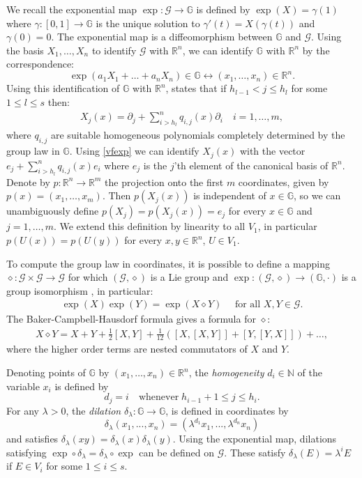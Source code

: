 \documentclass[reqno, 11pt]{amsart}
\theoremstyle{definition}
\theoremstyle{remark}
\numberwithin{theorem}{section}
\numberwithin{equation}{section}
\begin{document}
We recall the exponential map $\exp \colon \mathcal{G}\to \mathbb{G}$ is defined by $\exp(X)=\gamma(1)$ where
$\gamma \colon[0,1]\to \mathbb{G}$ is the unique solution to $\gamma'(t)=X(\gamma(t))$ and $\gamma(0)=0$. 
The exponential map is a diffeomorphism between $\mathbb{G}$ and $\mathcal{G}$. Using the basis $X_{1}, \ldots, X_{n}$ to identify $\mathcal{G}$ with $\mathbb{R}^n$, we can identify $\mathbb{G}$ with $\mathbb{R}^{n}$ by the correspondence:
\[ \exp(a_{1}X_{1}+\ldots +a_{n}X_{n})\in \mathbb{G} \longleftrightarrow (x_{1}, \ldots, x_{n})\in \mathbb{R}^{n}.\]
Using this identification of $\mathbb{G}$ with $\mathbb{R}^n$, \cite[Corollary 1.3.19]{BLU} states that if $h_{l-1}< j\leq h_l$ for some $1\leq l\leq s$ then:
\begin{align}\label{vfexp}
X_j(x)=\partial_j+\sum_{i>h_l}^n q_{i,j}(x)\partial_i \quad i=1,\ldots, m,
\end{align}
where $q_{i,j}$ are suitable homogeneous polynomials completely determined by the group law in $\mathbb{G}$. Using \eqref{vfexp} we can identify $X_j(x)$ with the vector
$e_j+\sum_{i>h_l}^n q_{i,j}(x)e_i$ where $e_j$ is the $j$'th element of the canonical basis of $\mathbb{R}^n$. Denote by $p\colon \mathbb{R}^{n} \to \mathbb{R}^{m}$ the projection onto the first $m$ coordinates, given by $p(x)=(x_{1}, \ldots, x_{m})$. Then $p(X_{j}(x))$ is independent of $x\in \mathbb{G}$, so we can unambiguously define $p(X_j)=p(X_j(x))=e_j$ for every $x\in\mathbb{G}$ and $j=1,\ldots, m$. We extend this definition by linearity to all $V_1$, in particular $p(U(x))=p(U(y))$ for every $x,y\in \mathbb{R}^n$, $U\in V_1$.

To compute the group law in coordinates, it is possible to define a mapping $\diamond\colon \mathcal{G}\times \mathcal{G}\to \mathcal{G}$ for which $(\mathcal{G}, \diamond)$ is a Lie group and $\exp \colon (\mathcal{G},\diamond)\to (\mathbb{G},\cdot)$ is a group isomorphism \cite[Theorem 2.2.13]{BLU}, in particular:
\begin{align}\label{usefuldiamond}
\exp(X)\exp(Y)=\exp(X\diamond Y)\quad \mbox{ for all } X,Y\in\mathcal{G}.
\end{align}
The Baker-Campbell-Hausdorf formula gives a formula for $\diamond$:
\begin{align}\label{BCH}
X\diamond Y= X+Y+\frac{1}{2}[X,Y]+\frac{1}{12}([X,[X,Y]]+[Y,[Y,X]]) + \ldots,
\end{align}
where the higher order terms are nested commutators of $X$ and $Y$.

Denoting points of $\mathbb{G}$ by $(x_{1}, \ldots, x_{n})\in \mathbb{R}^{n}$, the \emph{homogeneity} $d_i\in{\mathbb{N}}$ of the variable $x_i$ is defined by
\[ d_j=i \quad\text {whenever}\; h_{i-1}+1\leq j\leq h_{i}.\]
For any $\lambda >0$, the \emph{dilation} $\delta_\lambda\colon {\mathbb{G}}\to{\mathbb{G}}$, is defined in coordinates by
\[\delta_\lambda(x_1,...,x_n)=(\lambda^{d_1}x_1,...,\lambda^{d_n}x_n)\]
and satisfies $\delta_{\lambda}(xy)=\delta_{\lambda}(x)\delta_{\lambda}(y)$. Using the exponential map, dilations satisfying $\exp \circ \delta_{\lambda} = \delta_{\lambda}\circ \exp$ can be defined on $\mathcal{G}$. These satisfy $\delta_{\lambda}(E)=\lambda^{i}E$ if $E\in V_{i}$ for some $1\leq i\leq s$.
\end{document}
